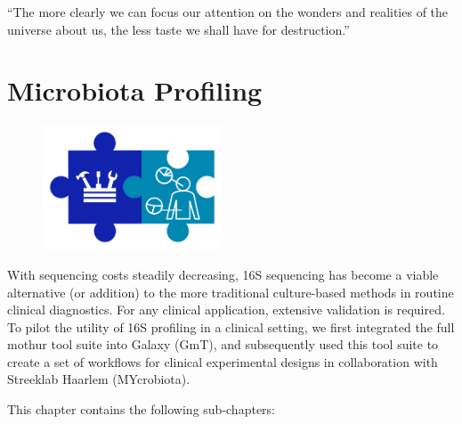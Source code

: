 \cleartorightpage
\begin{savequote}[75mm]
“The more clearly we can focus our attention on the wonders and realities of the universe about us, the less taste we shall have for destruction.”
\end{savequote}

\chapter{Microbiota Profiling}\label{chapter:microbiota}
\setcounter{figure}{-1}
\setcounter{table}{-1}
\setcounter{section}{-1}

\begin{figure}[t!]
\includegraphics[height=10em]{frontmatter/images/chapter-header-microbiota-tools.png}
\end{figure}
\setcounter{figure}{-1}
\setcounter{table}{-1}
\setcounter{section}{-1}

With sequencing costs steadily decreasing, 16S sequencing has become a viable alternative (or addition) to the more traditional culture-based methods in routine clinical diagnostics. For any clinical application, extensive validation is required. To pilot the utility of 16S profiling in a clinical setting, we first integrated the full mothur tool suite into Galaxy (GmT), and subsequently used this tool suite to create a set of workflows for clinical experimental designs in collaboration with Streeklab Haarlem (MYcrobiota).

This chapter contains the following sub-chapters:

